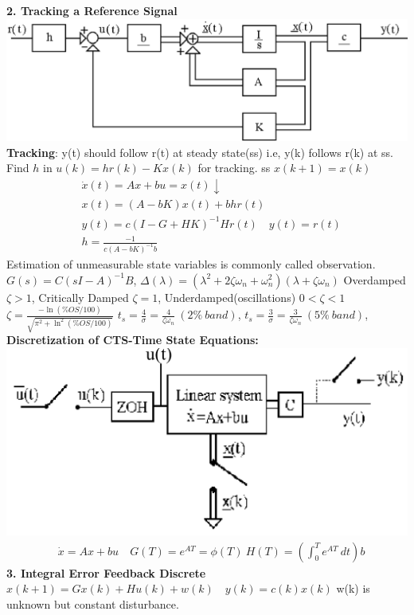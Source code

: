 \textbf{2. Tracking a Reference Signal}
\includegraphics[width=\linewidth]{trackingRefSig.png}
\textbf{Tracking}: y(t) should follow r(t) at steady state(ss)
i.e, y(k) follows r(k) at ss. Find $h$ in $u(k)=hr(k) -Kx(k)$ for tracking. ss $x(k+1)=x(k)$
\begin{align*}
& \dot{x}(t)=Ax+bu=x(t) \downarrow \\
& x(t)=(A-bK)x(t)+bhr(t) \\
& y(t)= c(I-G+HK)^{-1}Hr(t) \quad y(t)=r(t) \\
& h = \frac{-1}{c(A-bK)^{-1}b}
\end{align*}
Estimation of unmeasurable state variables is commonly called observation. $G(s)=C(sI-A)^{-1}B$,
 $\Delta (\lambda)= (\lambda^2+2\zeta \omega_n+ \omega_n^2)(\lambda + \zeta \omega_n)$ \hfill \break 
Overdamped $\zeta > 1$, Critically Damped $\zeta=1$, Underdamped(oscillations) $0< \zeta < 1$
$\zeta = \frac{-\ln(\% OS /100)}{\sqrt{\pi^2 + \ln^2(\% OS /100)}}$
$t_{s} = \frac {4}{\sigma } = \frac {4}{\zeta \omega _{n}}\ \left ( 2\%\ band \right )$,
$t_{s} = \frac {3}{\sigma } = \frac {3}{\zeta \omega _{n}}\ \left ( 5\%\ band \right )$,
\columnbreak
\textbf{Discretization of CTS-Time State Equations:}
\includegraphics[width=\linewidth]{dis2CTS.png}
\begin{align*}
&  \dot{x}=Ax+bu \quad G(T)=e^{AT}= \phi(T) \ H(T) = (\int_0^T e^{AT} \ dt)b
\end{align*}
\textbf{3. Integral Error Feedback Discrete}
$
x(k+1)=Gx(k)+Hu(k)+w(k) \quad y(k)=c(k)x(k) 
$
w(k) is unknown but constant disturbance.

